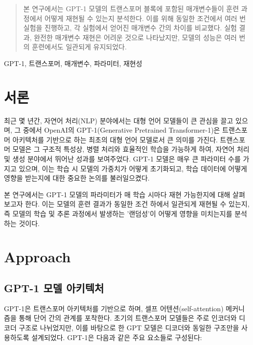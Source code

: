 \documentclass[conference]{IEEEtran}
\begin{document}
\begin{abstract}
본 연구에서는 GPT-1 모델의 트랜스포머 블록에 포함된 매개변수들이 훈련 과정에서 어떻게 재현될 수 있는지 분석한다. 이를 위해 동일한 조건에서 여러 번 실험을 진행하고, 각 실험에서 얻어진 매개변수 간의 차이를 비교했다. 실험 결과, 완전한 매개변수 재현은 어려운 것으로 나타났지만, 모델의 성능은 여러 번의 훈련에서도 일관되게 유지되었다.\end{abstract}

\begin{IEEEkeywords}
GPT-1, 트랜스포머, 매개변수, 파라미터, 재현성
\end{IEEEkeywords}

\section{서론}
최근 몇 년간, 자연어 처리(NLP) 분야에서는 대형 언어 모델들이 큰 관심을 끌고 있으며, 그 중에서 OpenAI의 GPT-1(Generative Pretrained Transformer-1)은 트랜스포머 아키텍처를 기반으로 하는 최초의 대형 언어 모델로서 큰 의미를 가진다. 트랜스포머 모델은 그 구조적 특성상, 병렬 처리와 효율적인 학습을 가능하게 하여, 자연어 처리 및 생성 분야에서 뛰어난 성과를 보여주었다. GPT-1 모델은 매우 큰 파라미터 수를 가지고 있으며, 이는 학습 시 모델의 가중치가 어떻게 초기화되고, 학습 데이터에 어떻게 영향을 받는지에 대한 중요한 논의를 불러일으켰다.

본 연구에서는 GPT-1 모델의 파라미터가 매 학습 시마다 재현 가능한지에 대해 살펴보고자 한다. 이는 모델의 훈련 결과가 동일한 조건 하에서 일관되게 재현될 수 있는지, 즉 모델의 학습 및 추론 과정에서 발생하는 '랜덤성'이 어떻게 영향을 미치는지를 분석하는 것이다.
\section{Approach}

\subsection{GPT-1 모델 아키텍처}

GPT-1은 트랜스포머 아키텍처를 기반으로 하며, 셀프 어텐션(self-attention) 메커니즘을 통해 단어 간의 관계를 포착한다. 초기의 트랜스포머 모델들은 주로 인코더와 디코더 구조로 나뉘었지만, 이를 바탕으로 한 GPT 모델은 디코더와 동일한 구조만을 사용하도록 설계되었다. GPT-1은 다음과 같은 주요 요소들로 구성된다:\\
\end{document}
